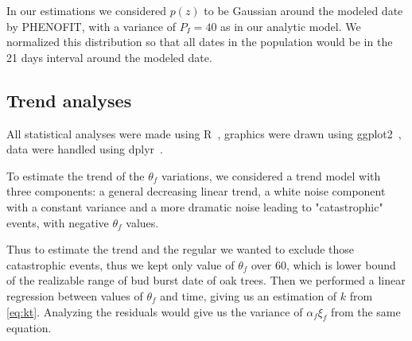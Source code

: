 In our estimations we considered $p(z)$ to be Gaussian around the modeled date by \textsc{PHENOFIT}, with a variance of $P_I=40$ as in our analytic model. We normalized this distribution so that all dates in the population would be in the 21 days interval around the modeled date.

\subsection*{Trend analyses}

All statistical analyses were made using R~\citep{R_2014}, graphics were drawn using ggplot2~\citep{ggplot2_2009}, data were handled using dplyr~\citep{dplyr_2014}.

To estimate the trend of the $\theta_f$ variations, we considered a trend model with three components: a general decreasing linear trend, a white noise component with a constant variance and a more dramatic noise leading to "catastrophic" events, with negative $\theta_f$ values.

Thus to estimate the trend and the regular we wanted to exclude those catastrophic events, thus we kept only value of $\theta_f$ over 60, which is lower bound of the realizable range of bud burst date of oak trees. Then we performed a linear regression between values of $\theta_f$ and time, giving us an estimation of $k$ from \autoref{eq:kt}. Analyzing the residuals would give us the variance of $\alpha_f \xi_f$ from the same equation.

